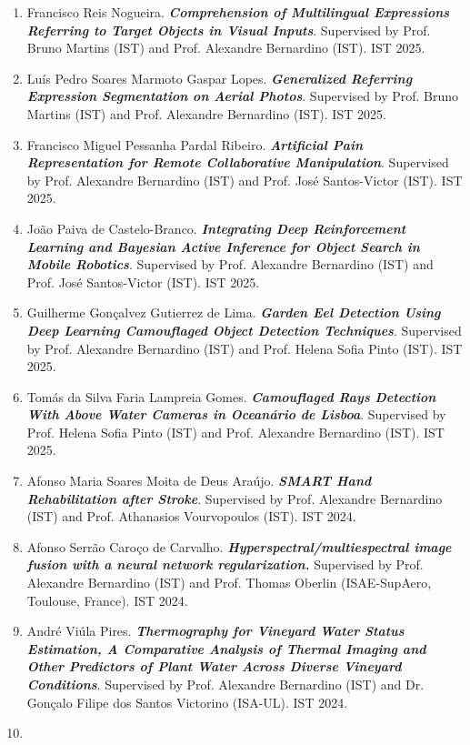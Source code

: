 \documentclass[
]{article}
\begin{document}
\begin{enumerate}
\item
  Francisco Reis Nogueira. \emph{\textbf{Comprehension of Multilingual
  Expressions Referring to Target Objects in Visual Inputs}}. Supervised
  by Prof. Bruno Martins (IST) and Prof. Alexandre Bernardino (IST). IST
  2025.
\item
  Luís Pedro Soares Marmoto Gaspar Lopes. \emph{\textbf{Generalized
  Referring Expression Segmentation on Aerial Photos}}. Supervised by
  Prof. Bruno Martins (IST) and Prof. Alexandre Bernardino (IST). IST
  2025.
\item
  Francisco Miguel Pessanha Pardal Ribeiro. \emph{\textbf{Artificial
  Pain Representation for Remote Collaborative Manipulation}}.
  Supervised by Prof. Alexandre Bernardino (IST) and Prof. José
  Santos-Victor (IST). IST 2025.
\item
  João Paiva de Castelo-Branco. \emph{\textbf{Integrating Deep
  Reinforcement Learning and Bayesian Active Inference for Object Search
  in Mobile Robotics}}. Supervised by Prof. Alexandre Bernardino (IST)
  and Prof. José Santos-Victor (IST). IST 2025.
\item
  Guilherme Gonçalvez Gutierrez de Lima. \emph{\textbf{Garden Eel
  Detection Using Deep Learning Camouflaged Object Detection
  Techniques}}. Supervised by Prof. Alexandre Bernardino (IST) and Prof.
  Helena Sofia Pinto (IST). IST 2025.
\item
  Tomás da Silva Faria Lampreia Gomes. \emph{\textbf{Camouflaged Rays
  Detection With Above Water Cameras in Oceanário de Lisboa}}.
  Supervised by Prof. Helena Sofia Pinto (IST) and Prof. Alexandre
  Bernardino (IST). IST 2025.
\item
  Afonso Maria Soares Moita de Deus Araújo. \emph{\textbf{SMART Hand
  Rehabilitation after Stroke}}. Supervised by Prof. Alexandre
  Bernardino (IST) and Prof. Athanasios Vourvopoulos (IST). IST 2024.
\item
  Afonso Serrão Caroço de Carvalho.
  \emph{\textbf{Hyperspectral/multiespectral image fusion with a neural
  network regularization.}} Supervised by Prof. Alexandre Bernardino
  (IST) and Prof. Thomas Oberlin (ISAE-SupAero, Toulouse, France). IST
  2024.
\item
  André Viúla Pires. \emph{\textbf{Thermography for Vineyard Water
  Status Estimation, A Comparative Analysis of Thermal Imaging and Other
  Predictors of Plant Water Across Diverse Vineyard Conditions}}.
  Supervised by Prof. Alexandre Bernardino (IST) and Dr. Gonçalo Filipe
  dos Santos Victorino (ISA-UL). IST 2024.
\item

\end{enumerate}
\end{document}
